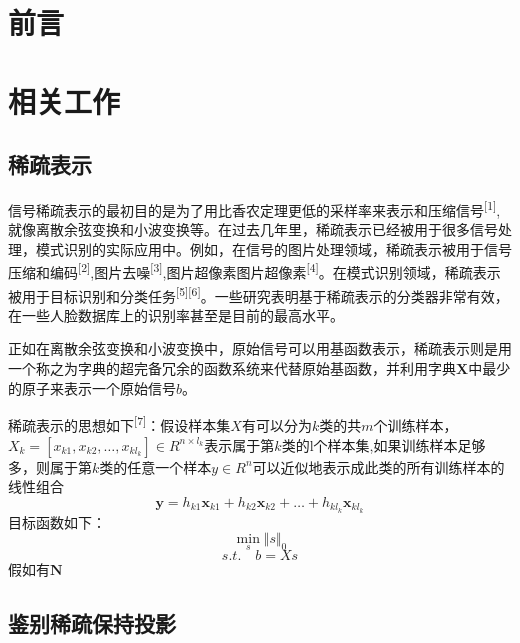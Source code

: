 \documentclass[bachelor,zhspacing]{cqu}  %
\begin{document}


\section{前言}\label{ux524dux8a00}

\section{相关工作}\label{ux76f8ux5173ux5de5ux4f5c}

\subsection{稀疏表示}\label{ux7a00ux758fux8868ux793a}

信号稀疏表示的最初目的是为了用比香农定理更低的采样率来表示和压缩信号\textsuperscript{{[}1{]}},就像离散余弦变换和小波变换等。在过去几年里，稀疏表示已经被用于很多信号处理，模式识别的实际应用中。例如，在信号的图片处理领域，稀疏表示被用于信号压缩和编码\textsuperscript{{[}2{]}},图片去噪\textsuperscript{{[}3{]}},图片超像素图片超像素\textsuperscript{{[}4{]}}。在模式识别领域，稀疏表示被用于目标识别和分类任务\textsuperscript{{[}5{]}}\textsuperscript{{[}6{]}}。一些研究表明基于稀疏表示的分类器非常有效，在一些人脸数据库上的识别率甚至是目前的最高水平。

正如在离散余弦变换和小波变换中，原始信号可以用基函数表示，稀疏表示则是用一个称之为字典的超完备冗余的函数系统来代替原始基函数，并利用字典\(\mathbf{X}\)中最少的原子来表示一个原始信号\(b\)。

稀疏表示的思想如下\textsuperscript{{[}7{]}}：假设样本集\(X\)有可以分为\(k\)类的共\(m\)个训练样本，\(X_{k} = [x_{k1},x_{k2},\ldots,x_{kl_{k}}]\in R^{n\times l_{k}}\)表示属于第\(k\)类的l个样本集,如果训练样本足够多，则属于第\(k\)类的任意一个样本\(y\in R^{n}\)可以近似地表示成此类的所有训练样本的线性组合
\[\mathbf{y}=h_{k1}\mathbf {x}_{k1}+h_{k2}\mathbf {x}_{k2}+\ldots+h_{kl_{k}}\mathbf {x}_{kl_{k}}\]
目标函数如下： \[\min_{s}\Vert{s}\Vert_{0}\] \[s.t. \quad b=Xs\]
假如有\(\mathbf{N}\)

\subsection{鉴别稀疏保持投影}\label{ux9274ux522bux7a00ux758fux4fddux6301ux6295ux5f71}
\end{document}
